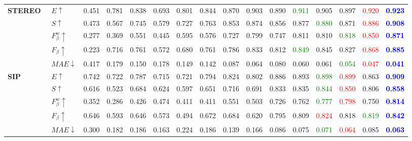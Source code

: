 \documentclass[runningheads]{llncs}
\begin{document}
\begin{table*}[tp]
{\begin{tabular}{lllccccccccccccc}
	\multirow{5}{*}{\textbf{STEREO}~\cite{3DSTEREO}} 
&$E\uparrow$		&0.451	&0.781	&0.838	&0.693	&0.801	&0.844	&0.870	&0.903	&0.890	&\textcolor{green}{0.911}	&0.905	&0.897	&\textcolor{red}{0.920}	&\textbf{\textcolor{blue}{0.923}}\\
&$S\uparrow$	&0.473	&0.567	&0.745	&0.579	&0.727	&0.763	&0.853	&0.874	&0.856	&0.877	&\textcolor{green}{0.880}	&0.871	&\textcolor{red}{0.886}	&\textbf{\textcolor{blue}{0.908}}\\
&$F_{\beta}^w\uparrow$			&0.277	&0.369	&0.551	&0.445	&0.595	&0.576	&0.727	&0.799	&0.747	&0.811	&0.810	&\textcolor{green}{0.818}	&\textcolor{red}{0.850}	&\textbf{\textcolor{blue}{0.871}}\\
&$F_{\beta}\uparrow$	&0.223	&0.716	&0.761	&0.572	&0.680	&0.761	&0.786	&0.833	&0.812	&\textcolor{green}{0.849}	&0.845	&0.827	&\textcolor{red}{0.868}	&\textbf{\textcolor{blue}{0.885}}\\
&$MAE\downarrow$			&0.417	&0.179	&0.150	&0.178	&0.149	&0.142	&0.087	&0.064	&0.080	&0.060	&0.061	&\textcolor{green}{0.054}	&\textcolor{red}{0.047}	&\textbf{\textcolor{blue}{0.041}}\\


									\cmidrule(r){1-16}
	\multirow{5}{*}{\textbf{SIP}~\cite{3DSIP}}
&$E\uparrow$		&0.742	&0.722	&0.787	&0.715	&0.721	&0.794	&0.824	&0.802	&0.886	&0.893	&\textcolor{green}{0.898}	&\textcolor{red}{0.899}	&0.863	&\textbf{\textcolor{blue}{0.909}}\\
&$S\uparrow$	&0.616	&0.523	&0.684	&0.624	&0.597	&0.651	&0.716	&0.691	&0.833	&0.835	&\textcolor{green}{0.844}	&\textcolor{red}{0.850}	&0.806	&\textbf{\textcolor{blue}{0.858}}\\
&$F_{\beta}^w\uparrow$			&0.352	&0.286	&0.426	&0.474	&0.411	&0.411	&0.551	&0.503	&0.726	&0.762	&\textcolor{green}{0.777}	&\textcolor{red}{0.798}	&0.750	&\textbf{\textcolor{blue}{0.814}}\\
&$F_{\beta}\uparrow$	&0.646	&0.593	&0.646	&0.573	&0.494	&0.672	&0.684	&0.620	&0.795	&0.809	&\textcolor{red}{0.824}	&0.818	&\textcolor{green}{0.819}	&\textbf{\textcolor{blue}{0.842}}\\
&$MAE\downarrow$			&0.300	&0.182	&0.186	&0.163	&0.224	&0.186	&0.139	&0.166	&0.086	&0.075	&\textcolor{green}{0.071}	&\textcolor{red}{0.064}	&0.085	&\textbf{\textcolor{blue}{0.063}}\\
									\cmidrule(r){1-16}


\end{tabular}}
\end{table*}
\end{document}
